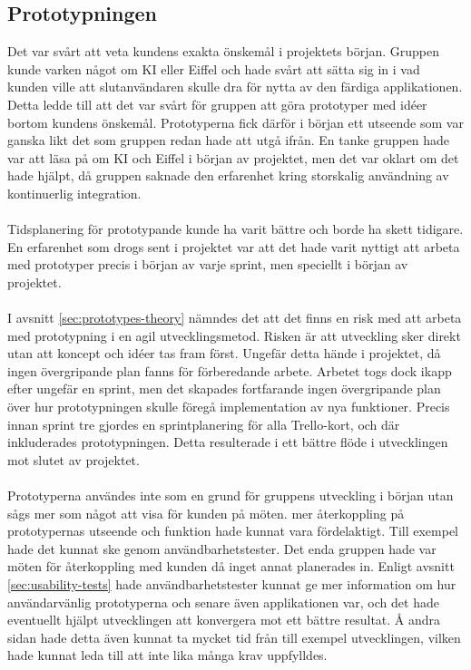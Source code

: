 \subsection{Prototypningen}
\label{sec:discussion-prototyping}
Det var svårt att veta kundens exakta önskemål i projektets början. Gruppen kunde varken något om KI eller Eiffel och hade svårt att sätta sig in i vad kunden ville att slutanvändaren skulle dra för nytta av den färdiga applikationen. Detta ledde till att det var svårt för gruppen att göra prototyper med idéer bortom kundens önskemål. Prototyperna fick därför i början ett utseende som var ganska likt det som gruppen redan hade att utgå ifrån. En tanke gruppen hade var att läsa på om KI och Eiffel i början av projektet, men det var oklart om det hade hjälpt, då gruppen saknade den erfarenhet kring storskalig användning av kontinuerlig integration.
\\ \\
Tidsplanering för prototypande kunde ha varit bättre och borde ha skett tidigare. En erfarenhet som drogs sent i projektet var att det hade varit nyttigt att arbeta med prototyper precis i början av varje sprint, men speciellt i början av projektet. 
\\ \\
I avsnitt \ref{sec:prototypes-theory} nämndes det att det finns en risk med att arbeta med prototypning i en agil utvecklingsmetod. Risken är att utveckling sker direkt utan att koncept och idéer tas fram först. Ungefär detta hände i projektet, då ingen övergripande plan fanns för förberedande arbete. Arbetet togs dock ikapp efter ungefär en sprint, men det skapades fortfarande ingen övergripande plan över hur prototypningen skulle föregå implementation av nya funktioner.
Precis innan sprint tre gjordes en sprintplanering för alla Trello-kort, och där inkluderades prototypningen. Detta resulterade i ett bättre flöde i utvecklingen mot slutet av projektet.
\\ \\
Prototyperna användes inte som en grund för gruppens utveckling i början utan sågs mer som något att visa för kunden på möten. mer återkoppling på prototypernas utseende och funktion hade kunnat vara fördelaktigt. Till exempel hade det kunnat ske genom användbarhetstester. Det enda gruppen hade var möten för återkoppling med kunden då inget annat planerades in. Enligt avsnitt \ref{sec:usability-tests} hade användbarhetstester kunnat ge mer information om hur användarvänlig prototyperna och senare även applikationen var, och det hade eventuellt hjälpt utvecklingen att konvergera mot ett bättre resultat. Å andra sidan hade detta även kunnat ta mycket tid från till exempel utvecklingen, vilken hade kunnat leda till att inte lika många krav uppfylldes.  
